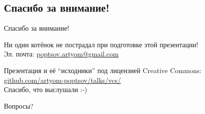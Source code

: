 \documentclass[presentation]{beamer}
\begin{document}
\subsection{Спасибо за внимание!}
\begin{frame}{Спасибо за внимание!}
  \large

  \raisebox{-.30em}{\Large\HandRight}\hspace{.25em} Ни один котёнок не
  пострадал при подготовке этой презентации! \\[30pt]

  Эл. почта: \url{poptsov.artyom@gmail.com}

  \medskip

  Презентация и её ``исходники'' под лицензией Creative Commons:
  \url{github.com/artyom-poptsov/talks/vcs/} \\[10pt]

  Спасибо, что выслушали  :-) \\[30pt]

  \bigskip

  \huge Вопросы?
\end{frame}


\end{document}
